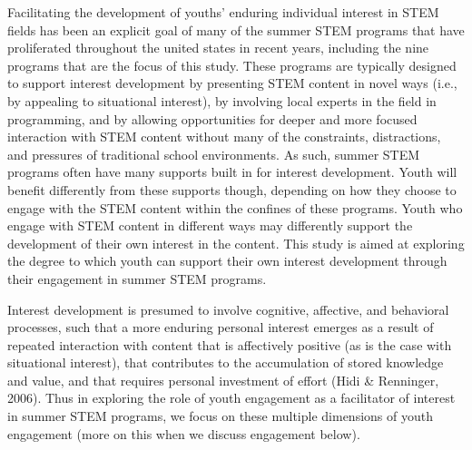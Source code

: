 \documentclass[man]{apa6}
\theoremstyle{definition}
\theoremstyle{definition}
\theoremstyle{definition}
\theoremstyle{remark}
\begin{document}
Facilitating the development of youths' enduring individual interest in
STEM fields has been an explicit goal of many of the summer STEM
programs that have proliferated throughout the united states in recent
years, including the nine programs that are the focus of this study.
These programs are typically designed to support interest development by
presenting STEM content in novel ways (i.e., by appealing to situational
interest), by involving local experts in the field in programming, and
by allowing opportunities for deeper and more focused interaction with
STEM content without many of the constraints, distractions, and
pressures of traditional school environments. As such, summer STEM
programs often have many supports built in for interest development.
Youth will benefit differently from these supports though, depending on
how they choose to engage with the STEM content within the confines of
these programs. Youth who engage with STEM content in different ways may
differently support the development of their own interest in the
content. This study is aimed at exploring the degree to which youth can
support their own interest development through their engagement in
summer STEM programs.

Interest development is presumed to involve cognitive, affective, and
behavioral processes, such that a more enduring personal interest
emerges as a result of repeated interaction with content that is
affectively positive (as is the case with situational interest), that
contributes to the accumulation of stored knowledge and value, and that
requires personal investment of effort (Hidi \& Renninger, 2006). Thus
in exploring the role of youth engagement as a facilitator of interest
in summer STEM programs, we focus on these multiple dimensions of youth
engagement (more on this when we discuss engagement below).
\end{document}
